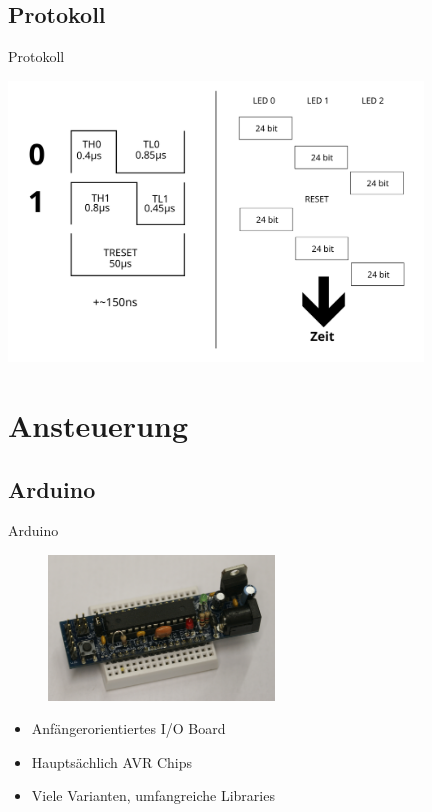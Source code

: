 \documentclass{beamer}
\begin{document}
\subsection{Protokoll}
\begin{frame}{Protokoll}
\begin{center}
 \includegraphics[width=11cm]{protokoll}
\end{center}
\end{frame}

\section{Ansteuerung}
\subsection{Arduino}
\begin{frame}{Arduino}
\begin{figure}[h]
 \centering
 \includegraphics[width=6cm,keepaspectratio=true]{./img/_MG_4522.JPG}
\end{figure}
\begin{itemize}
 \item Anfängerorientiertes I/O Board
 \item Hauptsächlich AVR Chips
 \item Viele Varianten, umfangreiche Libraries

\end{itemize}
\end{frame}
\end{document}
